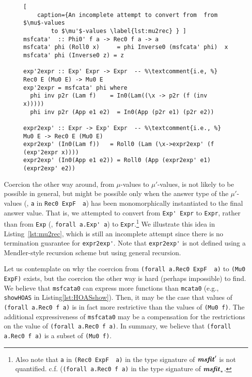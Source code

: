 \begin{figure}

\vspace*{-3ex}
\end{figure}

\begin{figure}
\begin{lstlisting}[
	caption={An incomplete attempt to convert from  from $\mu$-values
		to $\mu'$-values \label{lst:mu2rec} } ]
msfcata'  :: Phi0' f a -> Rec0 f a -> a
msfcata' phi (Roll0 x)     = phi Inverse0 (msfcata' phi)  x
msfcata' phi (Inverse0 z) = z

exp'2expr :: Exp' Expr -> Expr  -- %\textcomment{i.e, %} Rec0 E (Mu0 E) -> Mu0 E
exp'2expr = msfcata' phi where
  phi inv p2r (Lam f)    = In0(Lam((\x -> p2r (f (inv x)))))
  phi inv p2r (App e1 e2)  = In0(App (p2r e1) (p2r e2))

expr2exp' :: Expr -> Exp' Expr  -- %\textcomment{i.e., %} Mu0 E -> Rec0 E (Mu0 E)
expr2exp' (In0(Lam f))   = Roll0 (Lam (\x->expr2exp' (f (exp'2expr x))))
expr2exp' (In0(App e1 e2)) = Roll0 (App (expr2exp' e1) (expr2exp' e2))
\end{lstlisting}
\vspace*{-3ex}
\end{figure}

Coercion the other way around, from $\mu$-values to $\mu'$-values,
is not likely to be possible in general, but might be possible
only when the answer type of the $\mu'$-values (\eg, \lstinline{a}
in \lstinline{Rec0 ExpF  a}) has been monomorphically instantiated
to the final answer value. That is, we attempted to convert from
\lstinline{Exp' Expr} to \lstinline{Expr}, rather than from \lstinline{Exp}
(\ie, \lstinline{forall a.Exp' a}) to \lstinline{Expr}.\footnote{
	Also note that \lstinline{a} in \lstinline{(Rec0 ExpF  a)}
	in the type signature of $\textbf{\textit{msfit}}_{}'$
	is not quantified. {c.f.} (\lstinline{(forall a.Rec0 f a)}
	in the type signature of $\textbf{\textit{msfit}}_{*}$.}
We illustrate this idea in Listing~\ref{lst:mu2rec}, which is still
an incomplete attempt since there is no termination guarantee for
\lstinline{expr2exp'}. Note that \lstinline{expr2exp'} is not defined
using a Mendler-style recursion scheme but using general recursion.

Let us contemplate on why the coercion from \lstinline{(forall a.Rec0 ExpF  a)}
to \lstinline{(Mu0 ExpF)} exists, but the coercion the other way is hard
(perhaps impossible) to find. We believe that \lstinline{msfcata0} can
express more functions than \lstinline{mcata0} (e.g., \lstinline{showHOAS}
in Listing\;\ref{lst:HOASshow}). Then, it may be the case that values of
\lstinline{(forall a.Rec0 f a)} is in fact more restrictive than
the values of \lstinline{(Mu0 f)}. The additional expressiveness of
\lstinline{msfcata0} may be a compensation for the restrictions on
the value of \lstinline{(forall a.Rec0 f a)}. In summary, we believe
that \lstinline{(forall a.Rec0 f a)} is a subset of \lstinline{(Mu0 f)}.


